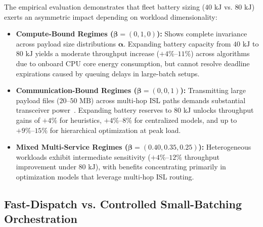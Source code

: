 The empirical evaluation demonstrates that fleet battery sizing ($40\text{ kJ}$ vs. $80\text{ kJ}$) exerts an asymmetric impact depending on workload dimensionality:
\begin{itemize}
    \item \textbf{Compute-Bound Regimes ($\boldsymbol{\beta}=(0, 1, 0)$):} 
    Shows complete invariance across payload size distributions $\boldsymbol{\alpha}$. Expanding battery capacity from $40\text{ kJ}$ to $80\text{ kJ}$ yields a moderate throughput increase ($+4\%\text{--}11\%$) across algorithms due to onboard CPU core energy consumption, but cannot resolve deadline expirations caused by queuing delays in large-batch setups.
    \item \textbf{Communication-Bound Regimes ($\boldsymbol{\beta}=(0, 0, 1)$):} 
    Transmitting large payload files ($20\text{--}50\text{ MB}$) across multi-hop ISL paths demands substantial transceiver power~\cite{chen2021isl}. Expanding battery reserves to $80\text{ kJ}$ unlocks throughput gains of $+4\%$ for heuristics, $+4\%\text{--}8\%$ for centralized models, and up to $+9\%\text{--}15\%$ for hierarchical optimization at peak load.
    \item \textbf{Mixed Multi-Service Regimes ($\boldsymbol{\beta}=(0.40, 0.35, 0.25)$):} 
    Heterogeneous workloads exhibit intermediate sensitivity ($+4\%\text{--}12\%$ throughput improvement under $80\text{ kJ}$), with benefits concentrating primarily in optimization models that leverage multi-hop ISL routing.
\end{itemize}

\subsection{Fast-Dispatch vs. Controlled Small-Batching Orchestration}
\label{subsec:tradeoff_dispatch_policies}

